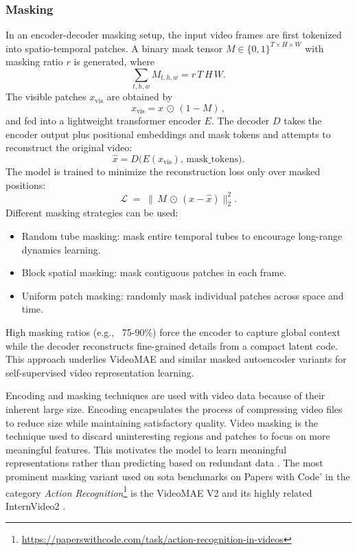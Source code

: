 \subsubsection{Masking}

In an encoder-decoder masking setup, the input video frames are first tokenized into spatio-temporal patches. A binary mask tensor \(M\in\{0,1\}^{T\times H\times W}\) with masking ratio \(r\) is generated, where
\[
\sum_{t,h,w} M_{t,h,w} = r\,T\,H\,W.
\]
The visible patches \(x_\text{vis}\) are obtained by
\[
x_\text{vis} = x \,\odot\,(1 - M)\,,
\]
and fed into a lightweight transformer encoder \(E\). The decoder \(D\) takes the encoder output plus positional embeddings and mask tokens and attempts to reconstruct the original video:
\[
\hat{x} = D\bigl(E(x_\text{vis}),\,\text{mask\_tokens}\bigr).
\]
The model is trained to minimize the reconstruction loss only over masked positions:
\[
\mathcal{L} \;=\; \bigl\lVert\,M \,\odot\,(x - \hat{x})\bigr\rVert_2^2.
\]
Different masking strategies can be used:
\begin{itemize}
    \item Random tube masking: mask entire temporal tubes to encourage long-range dynamics learning.
    \item Block spatial masking: mask contiguous patches in each frame.
    \item Uniform patch masking: randomly mask individual patches across space and time.
\end{itemize}
High masking ratios (e.g., \ 75-90\%) force the encoder to capture global context while the decoder reconstructs fine-grained details from a compact latent code. This approach underlies VideoMAE and similar masked autoencoder variants for self-supervised video representation learning.


Encoding and masking techniques are used with video data because of their inherent large size. Encoding encapsulates the process of compressing video files to reduce size while maintaining satisfactory quality. Video masking is the technique used to discard uninteresting regions and patches to focus on more meaningful features. This motivates the model to learn meaningful representations rather than predicting based on redundant data \cite{tong_videomae_2022}. The most prominent masking variant used on \acrshort{sota} benchmarks on Papers with Code' in the category \textit{Action Recognition}\footnote{\url{https://paperswithcode.com/task/action-recognition-in-videos}} is the VideoMAE V2 \cite{wang_videomae_2023} and its highly related InternVideo2 \cite{wang_internvideo2_2024}. 

